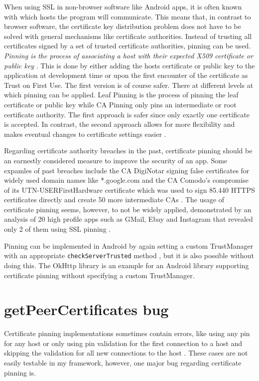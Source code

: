 \documentclass[draft,final]{vutinfth} %
\begin{document}
When using SSL in non-browser software like Android apps, it is often known with which hosts the program will communicate. This means that, in contrast to browser software, the certificate key distribution problem does not have to be solved with general mechanisms like certificate authorities. Instead of trusting all certificates signed by a set of trusted certificate authorities, pinning can be used. \textit{Pinning is the process of associating a host with their expected X509 certificate or public key} \cite{Pinning}. This is done by either adding the hosts certificate or public key to the application at development time or upon the first encounter of the certificate as Trust on First Use. The first version is of course safer. There at different levels at which pinning can be applied. Leaf Pinning is the process of pinning the leaf certificate or public key while CA Pinning only pins an intermediate or root certificate authority. The first approach is safer since only exactly one certificate is accepted. In contrast, the second approach allows for more flexibility and makes eventual changes to certificate settings easier \cite{Pinning}.

Regarding certificate authority breaches in the past, certificate pinning should be an earnestly considered measure to improve the security of an app. Some expamles of past breaches include the CA DigiNotar signing false certificates for widely used domain names like *.google.com and the CA Comodo's compromise of its UTN-USERFirstHardware certificate which was used to sign 85.440 HTTPS certificates directly and create 50 more intermediate CAs \cite{Arnbak}. The usage of certificate pinning seems, however, to not be widely applied, demonstrated by an analysis of 20 high profile apps such as GMail, Ebay and Instagram that revealed only 2 of them using SSL pinning  \cite{Fahl2012}.

Pinning can be implemented in Android by again setting a custom TrustManager with an appropriate \texttt{checkServerTrusted} method \cite{Oltrogge}, but it is also possible without doing this. The OkHttp library \cite{OkHttp} is an example for an Android library supporting certificate pinning without specifying a custom TrustManager.

\section*{getPeerCertificates bug}

Certificate pinning implementations sometimes contain errors, like using any pin for any host or only using pin validation for the first connection to a host and skipping the validation for all new connections to the host \cite{PinningSymposium}. These cases are not easily testable in my framework, however, one major bug regarding certificate pinning is. 
\end{document}
